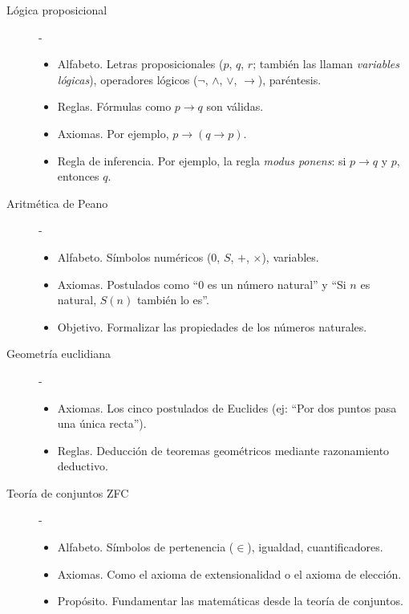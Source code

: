 \begin{description}
  \item[Lógica proposicional] -

    \begin{itemize}
      \item Alfabeto. Letras proposicionales ($p$, $q$, $r$; también las
        llaman \emph{variables lógicas}), operadores lógicos ($\neg$,
        $\land$, $\lor$, $\rightarrow$), paréntesis.

      \item Reglas. Fórmulas como $p \rightarrow q$ son válidas.

      \item Axiomas. Por ejemplo, $p \rightarrow (q \rightarrow p)$.

      \item Regla de inferencia. Por ejemplo, la regla \emph{modus ponens}:
        si $p \rightarrow q$ y $p$, entonces $q$.
    \end{itemize}

  \item[Aritmética de Peano] -

    \begin{itemize}
      \item Alfabeto. Símbolos numéricos (0, $S$, $+$, $\times$), variables.
      \item Axiomas. Postulados como ``0 es un número natural'' y ``Si $n$
        es natural, $S(n)$ también lo es''.
      \item Objetivo. Formalizar las propiedades de los números naturales.
    \end{itemize}

  \item[Geometría euclidiana] -

    \begin{itemize}
      \item Axiomas. Los cinco postulados de Euclides (ej: ``Por dos puntos
        pasa una única recta'').
      \item Reglas. Deducción de teoremas geométricos mediante razonamiento
        deductivo.
    \end{itemize}

  \item[Teoría de conjuntos ZFC] -

    \begin{itemize}
      \item Alfabeto. Símbolos de pertenencia ($\in$), igualdad,
        cuantificadores.
      \item Axiomas. Como el axioma de extensionalidad o el axioma de
        elección.
      \item Propósito. Fundamentar las matemáticas desde la teoría de
        conjuntos.
    \end{itemize}


\end{description}
